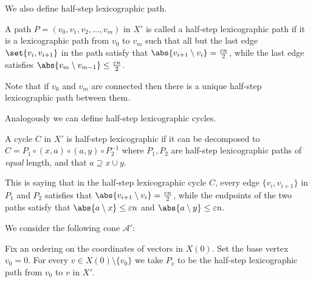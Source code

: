 We also define half-step lexicographic path.
\begin{definition}
    A path \(P=(v_0,v_1,v_2,\dots,v_m)\) in $X'$ is called a half-step lexicographic path if it is a lexicographic path from $v_0$ to $v_m$ such that all but the last edge \(\set{v_i,v_{i+1}}\) in the path satisfy that \(\abs{v_{i+1} \setminus v_i} = \frac{\varepsilon n}{2}\), while the last edge satisfies \(\abs{v_{m} \setminus v_{m-1}} \le \frac{\varepsilon n}{2}\).  
\end{definition}
Note that if \(v_0\) and \(v_m\) are connected then there is a unique half-step lexicographic path between them.  

Analogously we can define half-step lexicographic cycles.
\begin{definition}
    A cycle \(C\) in $X'$ is half-step lexicographic if it can be decomposed to \(C = P_1 \circ (x,a) \circ (a,y) \circ P_2^{-1}\) where \(P_1,P_2\) are half-step lexicographic paths of \textit{equal} length, and that $a \supseteq x \cup y$.
\end{definition}
This is saying that in the half-step lexicographic cycle $C$, every edge $\{v_i,v_{i+1}\}$ in $P_1$ and $P_2$ satisfies that  \(\abs{v_{i+1} \setminus v_i} = \frac{\varepsilon n}{2}\), while the endpoints of the two paths satisfy that $\abs{a \setminus x} \le \varepsilon n$ and $\abs{a \setminus y} \le \varepsilon n$. 


We consider the following cone $\mathcal{A}'$: 
\begin{definition}[Cone of $X'$]\label{def:cone-X'}
    Fix an ordering on the coordinates of vectors in $X(0)$. Set the base vertex \(v_0 = 0\). For every \(v \in X(0) \setminus\{v_0\}\) we take \(P_v\) to be the half-step lexicographic path from $v_0$ to $v$ in $X'$.  
\end{definition}




